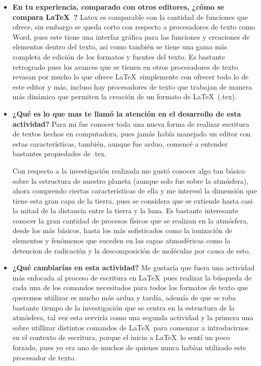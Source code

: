 \documentclass[12pt]{article}
\begin{document}
\begin{itemize}
\item \textbf{ En tu experiencia, comparado con otros editores, ¿cómo se compara \LaTeX\ ? }
Latex es comparable con la cantidad de funciones que ofrece, sin embargo se queda corto con respecto a procesadores de texto como Word, pues este tiene una interfaz gráfica para las funciones y creaciones de elementos dentro del texto, así como también se tiene una gama más completa de edición de los formatos y fuentes del texto. Es bastante retrogrado pues los avances que se tienen en otros procesadores de texto revasan por mucho lo que ofrece \LaTeX\ simplemente con ofrecer todo lo de este editor y más, incluso hay procesadores de texto que trabajan de manera más dinámica que permiten la creación de un formato de \LaTeX\ (.tex). 


\item \textbf{¿Qué es lo que mas te llamó la atención en el desarrollo de esta actividad?}
Para mi fue conocer toda una nueva forma de realizar escritura de textos hechos en computadora, pues jamás había manejado un editor con estas características, también, aunque fue arduo, comencé a entender bastantes propiedades de .tex.

Con respecto a la investigación realizada me gustó conocer algo tan básico sobre la estructura de nuestro planeta (aunque solo fue sobre la atmósfera), ahora comprendo ciertas características de ella y me interesó la dimensión que tiene esta gran capa de la tierra, pues se considera que se extiende hasta casi la mitad de la distancia entre la tierra y la luna. Es bastante interesante conocer la gran cantidad de procesos físicos que se realizan en la atmósfera, desde los más básicos, hasta los más sofisticados como la ionización de elementos y fenómenos que suceden en las capas atmosféricas como la detencion de radicación y la descomposición de moléculas por causa de esto.


\item \textbf{¿Qué cambiarías en esta actividad?}
Me gustaría que fuera una actividad más enfocada al proceso de escritura en \LaTeX\ pues realizar la búsqueda de cada una de los comandos necesitados para todos los formatos de texto que queremos utiilizar es mucho más ardua y tardía, además de que se roba bastante tiempo de la investigación que se centra en la estructura de la atmósfera, tal vez esta serviría como una segunda actividad y la primera una sobre utillizar distintos comandos de \LaTeX\ para comenzar a introducirnos en el contexto de escritura, porque el inicio a \LaTeX\ lo sentí un poco forzado, pues yo era uno de muchos de quienes nunca habían utilizado este procesador de texto.


\end{itemize}
\end{document}
